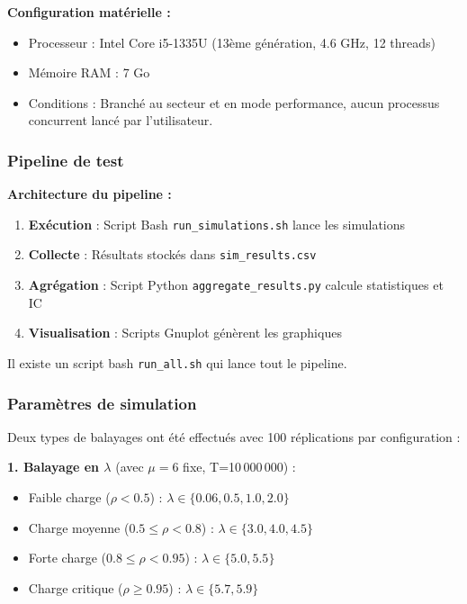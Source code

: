 \documentclass[12pt,a4paper]{article}
\begin{document}
\textbf{Configuration matérielle :}
\begin{itemize}
    \item Processeur : Intel Core i5-1335U (13ème génération, 4.6 GHz, 12 threads)
    \item Mémoire RAM : 7 Go
    \item Conditions : Branché au secteur et en mode performance, aucun processus concurrent lancé par l'utilisateur.
\end{itemize}

\subsubsection{Pipeline de test}

\textbf{Architecture du pipeline :}
\begin{enumerate}
    \item \textbf{Exécution} : Script Bash \texttt{run\_simulations.sh} lance les simulations
    \item \textbf{Collecte} : Résultats stockés dans \texttt{sim\_results.csv}
    \item \textbf{Agrégation} : Script Python \texttt{aggregate\_results.py} calcule statistiques et IC
    \item \textbf{Visualisation} : Scripts Gnuplot génèrent les graphiques
\end{enumerate}
Il existe un script bash \texttt{run\_all.sh} qui lance tout le pipeline.

\subsubsection{Paramètres de simulation}

Deux types de balayages ont été effectués avec 100 réplications par configuration :

\textbf{1. Balayage en $\lambda$} (avec $\mu=6$ fixe, T=10\,000\,000) :
\begin{itemize}[leftmargin=2em]
    \item Faible charge ($\rho < 0.5$) : $\lambda \in \{0.06, 0.5, 1.0, 2.0\}$
    \item Charge moyenne ($0.5 \leq \rho < 0.8$) : $\lambda \in \{3.0, 4.0, 4.5\}$
    \item Forte charge ($0.8 \leq \rho < 0.95$) : $\lambda \in \{5.0, 5.5\}$
    \item Charge critique ($\rho \geq 0.95$) : $\lambda \in \{5.7, 5.9\}$
\end{itemize}
\end{document}
